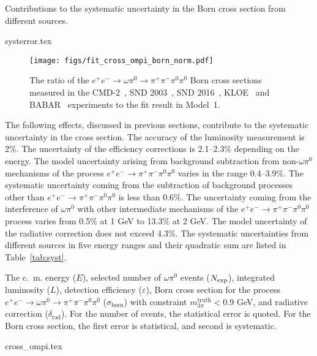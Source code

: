 \documentclass[twocolumn,aps,prd,floatfix,nofootinbib,superscriptaddress]{revtex4-2}
\begin{document}
\begin{table*}
\caption{Contributions to the systematic uncertainty in the Born cross section from different sources.}
\label{tab:syst}
\begin{ruledtabular}
{systerror.tex}
\end{ruledtabular}
\end{table*}

\begin{figure*}
\centering
\texttt{[image: figs/fit\_cross\_ompi\_born\_norm.pdf]}
\caption{
	The ratio of the \( e^+e^- \to \omega\pi^0 \to \pi^+\pi^-\pi^0\pi^0 \) Born cross sections measured in the CMD-2~\cite{cmd03}, SND 2003~\cite{snd2003}, SND 2016~\cite{snd2016}, KLOE~\cite{kloe08} and BABAR~\cite{babar17} experiments to the fit result in Model~1.
}
\label{fig:crossfitnorm}
\end{figure*}


The following effects, discussed in previous sections, contribute to the systematic uncertainty in the cross section.
The accuracy of the luminosity measurement is 2\%.
The uncertainty of the efficiency corrections is 2.1--2.3\% depending on the energy.
The model uncertainty arising from background subtraction from non-$\omega\pi^0$ mechanisms of the process \( e^+e^- \to \pi^+\pi^-\pi^0\pi^0 \) varies in the range 0.4--3.9\%.
The systematic uncertainty coming from the subtraction of background processes other than \( e^+e^- \to \pi^+\pi^-\pi^0\pi^0 \) is less than 0.6\%.
The uncertainty coming from the interference of $\omega\pi^0$ with other intermediate mechanisms of the \( e^+e^- \to \pi^+\pi^-\pi^0\pi^0 \) process varies from 0.5\% at 1 GeV to 13.3\% at 2 GeV.
The model uncertainty of the radiative correction does not exceed 4.3\%.
The systematic uncertainties from different sources in five energy ranges and their quadratic sum are listed in Table~\ref{tab:syst}.

\begin{table*}[p]
\caption{
	The c.~m. energy ($E$), selected number of $\omega\pi^0$ events ($N_{\rm exp}$), integrated luminosity ($L$), detection efficiency ($\varepsilon$), Born cross section for the process \( e^+e^- \to \omega\pi^0 \to \pi^+\pi^-\pi^0\pi^0 \) ($\sigma_\text{born}$) with constraint $m_{3\pi}^\text{truth} < 0.9$ GeV, and radiative correction ($\delta_\text{rad}$).
	For the number of events, the statistical error is quoted.
	For the Born cross section, the first error is statistical, and second is systematic.
}
\label{tab:crossfit}
\begin{ruledtabular}
\def\arraystretch{0.6}
{cross_ompi.tex}
\end{ruledtabular}
\end{table*}
\end{document}
